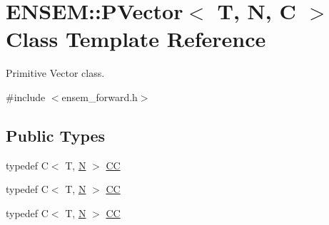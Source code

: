 \hypertarget{classENSEM_1_1PVector}{}\section{E\+N\+S\+EM\+:\+:P\+Vector$<$ T, N, C $>$ Class Template Reference}
\label{classENSEM_1_1PVector}


Primitive Vector class.  




{\ttfamily \#include $<$ensem\+\_\+forward.\+h$>$}

\subsection*{Public Types}
\begin{DoxyCompactItemize}
\item 
typedef C$<$ T, \mbox{\hyperlink{adat__devel_2lib_2hadron_2operator__name__util_8cc_a7722c8ecbb62d99aee7ce68b1752f337}{N}} $>$ \mbox{\hyperlink{classENSEM_1_1PVector_a92dc0a0a301a3dc96f7be5d337019bc7}{CC}}
\item 
typedef C$<$ T, \mbox{\hyperlink{adat__devel_2lib_2hadron_2operator__name__util_8cc_a7722c8ecbb62d99aee7ce68b1752f337}{N}} $>$ \mbox{\hyperlink{classENSEM_1_1PVector_a92dc0a0a301a3dc96f7be5d337019bc7}{CC}}
\item 
typedef C$<$ T, \mbox{\hyperlink{adat__devel_2lib_2hadron_2operator__name__util_8cc_a7722c8ecbb62d99aee7ce68b1752f337}{N}} $>$ \mbox{\hyperlink{classENSEM_1_1PVector_a92dc0a0a301a3dc96f7be5d337019bc7}{CC}}
\end{DoxyCompactItemize}
